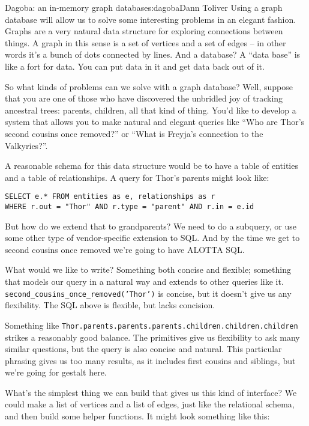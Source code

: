\begin{aosachapter}{Dagoba: an in-memory graph database}{s:dagoba}{Dann Toliver}
Using a graph database will allow us to solve some interesting problems
in an elegant fashion. Graphs are a very natural data structure for
exploring connections between things. A graph in this sense is a set of
vertices and a set of edges -- in other words it's a bunch of dots
connected by lines. And a database? A ``data base'' is like a fort for
data. You can put data in it and get data back out of it.

So what kinds of problems can we solve with a graph database? Well,
suppose that you are one of those who have discovered the unbridled joy
of tracking ancestral trees: parents, children, all that kind of thing.
You'd like to develop a system that allows you to make natural and
elegant queries like ``Who are Thor's second cousins once removed?'' or
``What is Freyja's connection to the Valkyries?''.

A reasonable schema for this data structure would be to have a table of
entities and a table of relationships. A query for Thor's parents might
look like:

\begin{verbatim}
SELECT e.* FROM entities as e, relationships as r 
WHERE r.out = "Thor" AND r.type = "parent" AND r.in = e.id
\end{verbatim}

But how do we extend that to grandparents? We need to do a subquery, or
use some other type of vendor-specific extension to SQL. And by the time
we get to second cousins once removed we're going to have ALOTTA SQL.

What would we like to write? Something both concise and flexible;
something that models our query in a natural way and extends to other
queries like it. \texttt{second\_cousins\_once\_removed('Thor')} is
concise, but it doesn't give us any flexibility. The SQL above is
flexible, but lacks concision.

Something like
\texttt{Thor.parents.parents.parents.children.children.children} strikes
a reasonably good balance. The primitives give us flexibility to ask
many similar questions, but the query is also concise and natural. This
particular phrasing gives us too many results, as it includes first
cousins and siblings, but we're going for gestalt here.

What's the simplest thing we can build that gives us this kind of
interface? We could make a list of vertices and a list of edges, just
like the relational schema, and then build some helper functions. It
might look something like this:


\end{aosachapter}
